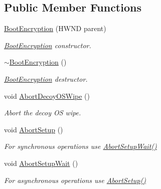 \subsection*{Public Member Functions}
\begin{DoxyCompactItemize}
\item 
\hyperlink{class_gost_crypt_1_1_boot_encryption_a4306025352fbfc8db0d572a0b21b64ff}{Boot\+Encryption} (H\+W\+ND parent)
\begin{DoxyCompactList}\small\item\em \hyperlink{class_gost_crypt_1_1_boot_encryption}{Boot\+Encryption} constructor. \end{DoxyCompactList}\item 
\mbox{\label{class_gost_crypt_1_1_boot_encryption_af5e992547f25234fa1419e16cdefe9cd}} 
\hyperlink{class_gost_crypt_1_1_boot_encryption_af5e992547f25234fa1419e16cdefe9cd}{$\sim$\+Boot\+Encryption} ()
\begin{DoxyCompactList}\small\item\em \hyperlink{class_gost_crypt_1_1_boot_encryption}{Boot\+Encryption} destructor. \end{DoxyCompactList}\item 
void \hyperlink{class_gost_crypt_1_1_boot_encryption_a8933f34e2803ba68a3c980cc01519c11}{Abort\+Decoy\+O\+S\+Wipe} ()
\begin{DoxyCompactList}\small\item\em Abort the decoy OS wipe. \end{DoxyCompactList}\item 
void \hyperlink{class_gost_crypt_1_1_boot_encryption_a8396cfba92f8b27ed9456e08ddb7be2b}{Abort\+Setup} ()
\begin{DoxyCompactList}\small\item\em For synchronous operations use \hyperlink{class_gost_crypt_1_1_boot_encryption_a43e9a83c907891f63e2f5b2a891471be}{Abort\+Setup\+Wait()} \end{DoxyCompactList}\item 
void \hyperlink{class_gost_crypt_1_1_boot_encryption_a43e9a83c907891f63e2f5b2a891471be}{Abort\+Setup\+Wait} ()
\begin{DoxyCompactList}\small\item\em For asynchronous operations use \hyperlink{class_gost_crypt_1_1_boot_encryption_a8396cfba92f8b27ed9456e08ddb7be2b}{Abort\+Setup()} \end{DoxyCompactList}\item 

\end{DoxyCompactItemize}
